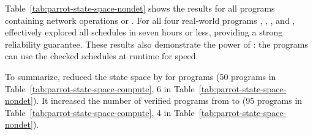Table~\ref{tab:parrot-state-space-nondet} shows the results for all
\nprognondetandnetwork programs containing network operations or
\nondets.  For all four real-world programs \pfscan, \partition,
\nthelement, and \partialsort, \ecosys effectively explored all
schedules in seven hours or less, providing a strong reliability
guarantee.  These results also demonstrate the power of \parrot:
the programs can use the checked schedules at runtime for speed.

To summarize, \parrot reduced the state space by \shrinkscale for
\nprogshrink programs (50 programs in Table~\ref{tab:parrot-state-space-compute},
6 in Table~\ref{tab:parrot-state-space-nondet}).  It increased the number of
verified programs from \nprogverifieddbug to \nprogverifiedxxx (95
programs in Table~\ref{tab:parrot-state-space-compute}, 4 in
Table~\ref{tab:parrot-state-space-nondet}).





